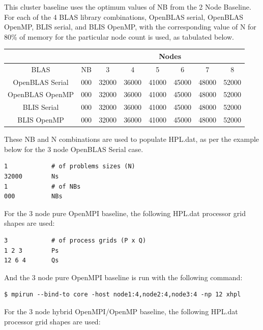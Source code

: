 \documentclass{report}
\begin{document}
This cluster baseline uses the optimum values of NB from the 2 Node Baseline. For each of the 4 BLAS library combinations, OpenBLAS serial, OpenBLAS OpenMP, BLIS serial, and BLIS OpenMP, with the corresponding value of N for 80\% of memory for the particular node count is used, as tabulated below.

\begin{center}
	\begin{tabular}{ |c|c|c|c|c|c|c|c| } 
		\hline
		\multicolumn{2}{|c|}{} & \multicolumn{6}{c|}{Nodes} \\
		\hline
		BLAS & NB & 3 & 4 & 5 & 6 & 7 & 8 \\ 
		\hline
		OpenBLAS Serial & 000 & 32000 & 36000 & 41000 & 45000 & 48000 & 52000 \\ 
		OpenBLAS OpenMP & 000 & 32000 & 36000 & 41000 & 45000 & 48000 & 52000 \\ 
 		BLIS Serial     & 000 & 32000 & 36000 & 41000 & 45000 & 48000 & 52000 \\
		BLIS OpenMP     & 000 & 32000 & 36000 & 41000 & 45000 & 48000 & 52000 \\ 
 		\hline
	\end{tabular}
\end{center}

These NB and N combinations are used to populate HPL.dat, as per the example below for the 3 node OpenBLAS Serial case.

\lstset{style=listing}
\begin{lstlisting}[numbers=none]
1            # of problems sizes (N)
32000        Ns
1            # of NBs
000          NBs
\end{lstlisting}

For the 3 node pure OpenMPI baseline, the following HPL.dat processor grid shapes are used: 

\lstset{style=listing}
\begin{lstlisting}[numbers=none]
3            # of process grids (P x Q)
1 2 3        Ps
12 6 4       Qs
\end{lstlisting}

And the 3 node pure OpenMPI baseline is run with the following command:

\lstset{style=type}
\begin{lstlisting}[]
$ mpirun --bind-to core -host node1:4,node2:4,node3:4 -np 12 xhpl
\end{lstlisting}

For the 3 node hybrid OpenMPI/OpenMP baseline, the following HPL.dat processor grid shapes are used: 
\end{document}
